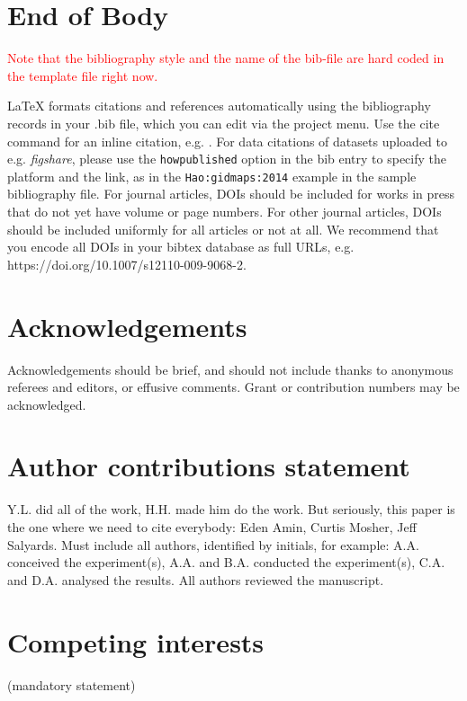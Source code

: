 \documentclass[fleqn,10pt]{wlscirep}
\begin{document}
\section{End of Body}\label{end-of-body}

\textcolor{red}{Note that the bibliography style and the name of the bib-file are hard coded in the template file right now.}



\noindent LaTeX formats citations and references automatically using the bibliography records in your .bib file, which you can edit via the project menu. Use the cite command for an inline citation, e.g. \cite{Kaufman2020, Figueredo:2009dg, Babichev2002, behringer2014manipulating}. For data citations of datasets uploaded to e.g. \emph{figshare}, please use the \verb|howpublished| option in the bib entry to specify the platform and the link, as in the \verb|Hao:gidmaps:2014| example in the sample bibliography file. For journal articles, DOIs should be included for works in press that do not yet have volume or page numbers. For other journal articles, DOIs should be included uniformly for all articles or not at all. We recommend that you encode all DOIs in your bibtex database as full URLs, e.g. https://doi.org/10.1007/s12110-009-9068-2.

\section*{Acknowledgements} 
Acknowledgements should be brief, and should not include thanks to
anonymous referees and editors, or effusive comments. Grant or
contribution numbers may be acknowledged.

\section*{Author contributions statement}

Y.L. did all of the work, H.H. made him do the work. But seriously, this
paper is the one where we need to cite everybody: Eden Amin, Curtis
Mosher, Jeff Salyards.
Must include all authors, identified by initials, for example:
A.A. conceived the experiment(s), A.A. and B.A. conducted the experiment(s), C.A. and D.A. analysed the results. All authors reviewed the manuscript. 

\section*{Competing interests} (mandatory statement)
\end{document}
